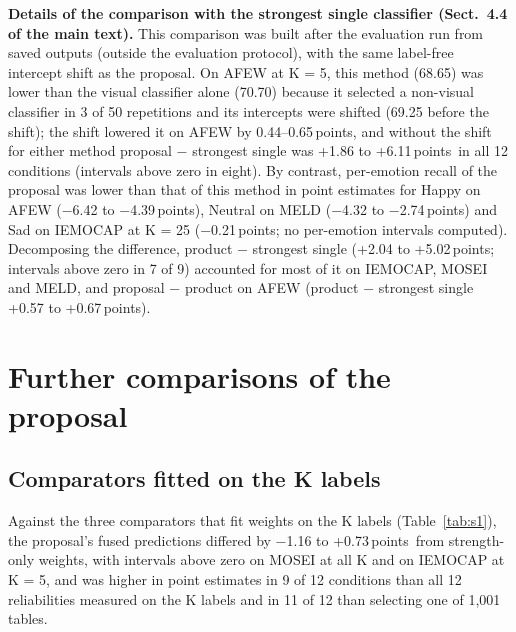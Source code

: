 \documentclass[sn-nature,pdflatex]{sn-jnl}
\newcommand{\pt}{\,points}
\begin{document}
\textbf{Details of the comparison with the strongest single classifier (Sect.~4.4 of the main text).} This comparison was built after the evaluation run from saved outputs (outside the evaluation protocol), with the same label-free intercept shift as the proposal. On AFEW at K = 5, this method (68.65) was lower than the visual classifier alone (70.70) because it selected a non-visual classifier in 3 of 50 repetitions and its intercepts were shifted (69.25 before the shift); the shift lowered it on AFEW by 0.44--0.65\pt, and without the shift for either method proposal $-$ strongest single was +1.86 to +6.11\pt\ in all 12 conditions (intervals above zero in eight). By contrast, per-emotion recall of the proposal was lower than that of this method in point estimates for Happy on AFEW ($-$6.42 to $-$4.39\pt), Neutral on MELD ($-$4.32 to $-$2.74\pt) and Sad on IEMOCAP at K = 25 ($-$0.21\pt; no per-emotion intervals computed). Decomposing the difference, product $-$ strongest single (+2.04 to +5.02\pt; intervals above zero in 7 of 9) accounted for most of it on IEMOCAP, MOSEI and MELD, and proposal $-$ product on AFEW (product $-$ strongest single +0.57 to +0.67\pt).

\section{Further comparisons of the proposal}\label{sec:s6}
\subsection{Comparators fitted on the K labels}
Against the three comparators that fit weights on the K labels (Table~\ref{tab:s1}), the proposal's fused predictions differed by $-$1.16 to +0.73\pt\ from strength-only weights, with intervals above zero on MOSEI at all K and on IEMOCAP at K = 5, and was higher in point estimates in 9 of 12 conditions than all 12 reliabilities measured on the K labels and in 11 of 12 than selecting one of 1,001 tables.
\end{document}

